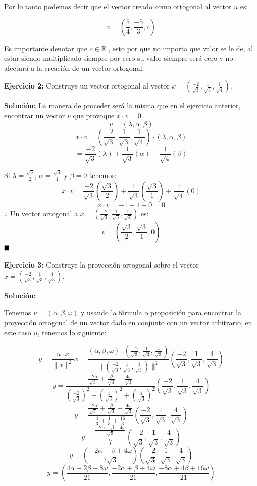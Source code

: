 \documentclass{article}
\begin{document}
Por lo tanto podemos decir que el vector creado como ortogonal al vector $u$ es:


$$v = (\frac{5}{4}, \frac{-5}{3}, c)$$


Es importante denotar que $c \in \mathbb{R}$ , esto por que no importa que valor se le de,
al estar siendo multiplicado siempre por cero su valor siempre será cero y no afectará a la creación de un vector ortogonal.
\vspace{10pt}


\textbf{Ejercicio 2: } Construye un vector ortogonal al vector $x = (\frac{-2}{\sqrt{3}}, \frac{1}{\sqrt{3}}, \frac{1}{\sqrt{4}})$.
\vspace{10pt}


\textbf{Solución:}
\vspace{10pt}
La manera de proceder será la misma que en el ejercicio anterior, encontrar un vector $v$ que provoque $x \cdot v = 0 $.
$$v = (\lambda, \alpha, \beta)$$
$$x \cdot v = (\frac{-2}{\sqrt{3}}, \frac{1}{\sqrt{3}}, \frac{1}{\sqrt{4}}) \cdot (\lambda, \alpha, \beta)$$
$$ = \frac{-2}{\sqrt{3}}(\lambda)+ \frac{1}{\sqrt{3}} (\alpha)+\frac{1}{\sqrt{4}}(\beta)$$


Si $\lambda=\frac{\sqrt{3}}{2}$, $\alpha = \frac{\sqrt{3}}{1}$ y $\beta = 0$ tenemos:
$$ x\cdot v= \frac{-2}{\sqrt{3}}(\frac{\sqrt{3}}{2})+ \frac{1}{\sqrt{3}} (\frac{\sqrt{3}}{1})+\frac{1}{\sqrt{4}}(0)$$
$$ x\cdot v= -1+ 1+0 = 0$$
$\therefore$ Un vector ortogonal a $x = (\frac{-2}{\sqrt{3}}, \frac{1}{\sqrt{3}}, \frac{1}{\sqrt{4}})$ es:
$$v = (\frac{\sqrt{3}}{2}, \frac{\sqrt{3}}{1}, 0)$$
$\hfill\blacksquare$
\vspace{10pt}


\textbf{Ejercicio 3:} Construye la proyección ortogonal sobre el vector $x = (\frac{-2}{\sqrt{3}}, \frac{1}{\sqrt{3}}, \frac{4}{\sqrt{3}})$.
\vspace{10pt}


\textbf{Solución:}
\vspace{10pt}


Tenemos $u = (\alpha, \beta , \omega)$ y usando la fórmula o proposición para encontrar la proyección ortogonal de un vector dado en
conjunto con un vector arbitrario, en este caso $u$, tenemos lo siguiente:


$$y =\frac{u \cdot x }{\|x\|^2} x = \frac{(\alpha, \beta , \omega)\cdot (\frac{-2}{\sqrt{3}}, \frac{1}{\sqrt{3}}, \frac{4}{\sqrt{3}})}{\|(\frac{-2}{\sqrt{3}}, \frac{1}{\sqrt{3}}, \frac{4}{\sqrt{3}})\|^2}(\frac{-2}{\sqrt{3}}, \frac{1}{\sqrt{3}}, \frac{4}{\sqrt{3}})$$
$$y = \frac{\frac{-2\alpha}{\sqrt{3}}+\frac{\beta}{\sqrt{3}}+ \frac{4\omega}{\sqrt{3}}}{(\frac{-2}{\sqrt{3}})^2+(\frac{1}{\sqrt{3}})^2+ (\frac{4}{\sqrt{3}})^2}(\frac{-2}{\sqrt{3}}, \frac{1}{\sqrt{3}}, \frac{4}{\sqrt{3}})$$
$$y = \frac{\frac{-2\alpha}{\sqrt{3}}+\frac{\beta}{\sqrt{3}}+ \frac{4\omega}{\sqrt{3}}}{\frac{4}{3}+\frac{1}{3}+ \frac{16}{3}}(\frac{-2}{\sqrt{3}}, \frac{1}{\sqrt{3}}, \frac{4}{\sqrt{3}})$$
$$y = \frac{\frac{-2\alpha+\beta+4\omega}{\sqrt{3}}}{7}(\frac{-2}{\sqrt{3}}, \frac{1}{\sqrt{3}}, \frac{4}{\sqrt{3}})$$
$$y = (\frac{-2\alpha+\beta+4\omega}{7\sqrt{3}})(\frac{-2}{\sqrt{3}}, \frac{1}{\sqrt{3}}, \frac{4}{\sqrt{3}})$$
$$y = (\frac{4\alpha-2\beta-8\omega}{21}, \frac{-2\alpha+\beta+4\omega}{21}, \frac{-8\alpha+4\beta+16\omega}{21})$$
\end{document}
